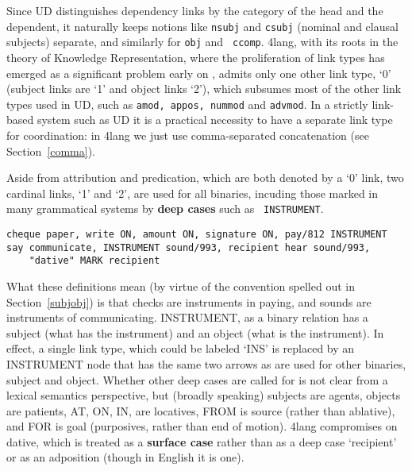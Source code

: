 \documentclass[11pt,bookmarks,bookmarksnumbered,naturalnames,plainpages=false,pdftex,colorlinks=true,urlcolor=blue,bookmarksdepth=subsection,plainpages=false]{paper}
\begin{document}
\noindent
Since UD distinguishes dependency links by the category of the head and the
dependent, it naturally keeps notions like {\tt nsubj} and {\tt csubj}
(nominal and clausal subjects) separate, and similarly for {\tt obj} and {\tt
  ccomp}. 4lang, with its roots in the theory of Knowledge Representation,
where the proliferation of link types has emerged as a significant problem
early on \citep{Woods:1975}, admits only one other link type, `0' (subject
links are `1' and object links `2'), which subsumes most of the other link
types used in UD, such as {\tt amod, appos, nummod} and {\tt advmod}.  In a
strictly link-based system such as UD it is a practical necessity to have a
separate link type for coordination: in 4lang we just use comma-separated
concatenation (see Section~\ref{comma}). 

Aside from attribution and predication, which are both denoted by a `0' link,
two cardinal links, `1' and `2', are used for all binaries, incuding those
marked in many grammatical systems by {\bf deep cases} such as {\tt
  INSTRUMENT}. 

\begin{verbatim}
cheque paper, write ON, amount ON, signature ON, pay/812 INSTRUMENT
say communicate, INSTRUMENT sound/993, recipient hear sound/993, 
    "dative" MARK recipient
\end{verbatim}

What these definitions mean (by virtue of the convention spelled out in
Section~\ref{subjobj}) is that checks are instruments in paying, and sounds
are instruments of communicating. INSTRUMENT, as a binary relation has a
subject (what has the instrument) and an object (what is the instrument). In
effect, a single link type, which could be labeled `INS' is replaced by an
INSTRUMENT node that has the same two arrows as are used for other binaries,
subject and object. Whether other deep cases are called for is not clear from
a lexical semantics perspective, but (broadly speaking) subjects are agents,
objects are patients, AT, ON, IN, are locatives, FROM is source (rather than
ablative), and FOR is goal (purposives, rather than end of motion). 4lang
compromises on dative, which is treated as a {\bf surface case} rather than as
a deep case `recipient' or as an adposition (though in English it is one).

\end{document}
